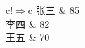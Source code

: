 \documentclass[nofonts]{ctexart}
\begin{document}
\begin{tabular}{c!{$\Rightarrow$}c}
	张三	& 85	\\
	李四	& 82	\\
	王五	& 70	\\
\end{tabular}
\end{document}
